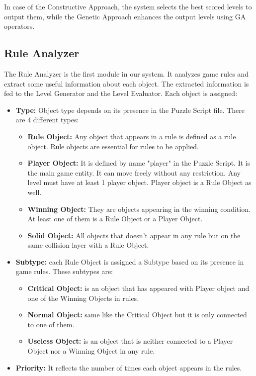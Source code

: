 In case of the Constructive Approach, the system selects the best scored levels to output them, while the Genetic Approach enhances the output levels using GA operators.

\subsection{Rule Analyzer}
The Rule Analyzer is the first module in our system. It analyzes game rules and extract some useful information about each object. The extracted information is fed to the Level Generator and the Level Evaluator. Each object is assigned:
\begin{itemize}
	\item \textbf{Type:} Object type depends on its presence in the Puzzle Script file. There are 4 different types:
	\begin{itemize} \itemsep0pt \parskip0pt 
		\item \textbf{Rule Object:} Any object that appears in a rule is defined as a rule object. Rule objects are essential for rules to be applied.
		\item \textbf{Player Object:} It is defined by name "player" in the Puzzle Script. It is the main game entity. It can move freely without any restriction. Any level must have at least 1 player object. Player object is a Rule Object as well.
		\item \textbf{Winning Object:} They are objects appearing in the winning condition. At least one of them is a Rule Object or a Player Object.
		\item \textbf{Solid Object:} All objects that doesn't appear in any rule but on the same collision layer with a Rule Object.
	\end{itemize}
	\item \textbf{Subtype:} each Rule Object is assigned a Subtype based on its presence in game rules. These subtypes are:
	\begin{itemize} \itemsep0pt \parskip0pt 
		\item \textbf{Critical Object:} is an object that has appeared with Player object and one of the Winning Objects in rules.
		\item \textbf{Normal Object:} same like the Critical Object but it is only connected to one of them.
		\item \textbf{Useless Object:} is an object that is neither connected to a Player Object nor a Winning Object in any rule.
	\end{itemize}
	\item \textbf{Priority:} It reflects the number of times each object appears in the rules.

\end{itemize}
